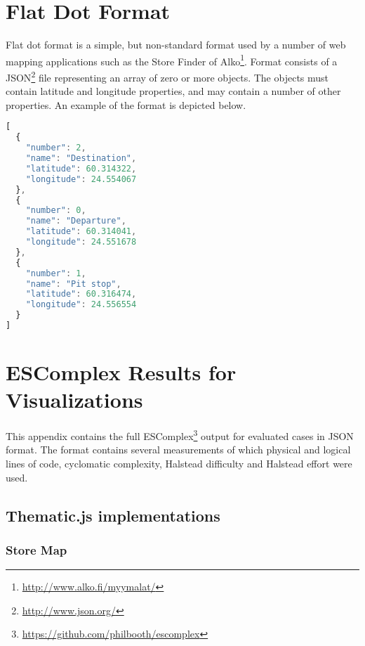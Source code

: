 
\chapter{Flat Dot Format}
\label{appendix:flatdotformat}

Flat dot format is a simple, but non-standard format used by a number of web mapping applications such as the Store Finder of Alko\footnote{\url{http://www.alko.fi/myymalat/}}. Format consists of a JSON\footnote{\url{http://www.json.org/}} file representing an array of zero or more objects. The objects must contain latitude and longitude properties, and may contain a number of other properties. An example of the format is depicted below.

\begin{lstlisting}[language=JavaScript]
[
  {
    "number": 2,
    "name": "Destination",
    "latitude": 60.314322,
    "longitude": 24.554067
  },
  {
    "number": 0,
    "name": "Departure",
    "latitude": 60.314041,
    "longitude": 24.551678
  },
  {
    "number": 1,
    "name": "Pit stop",
    "latitude": 60.316474,
    "longitude": 24.556554
  }
]
\end{lstlisting}

\chapter{ESComplex Results for Visualizations}
\label{appendix:escomplex}

This appendix contains the full ESComplex\footnote{\url{https://github.com/philbooth/escomplex}} output for evaluated cases in JSON format. The format contains several measurements of which physical and logical lines of code, cyclomatic complexity, Halstead difficulty and Halstead effort were used.


\section{Thematic.js implementations}

\subsection{Store Map}

% 

